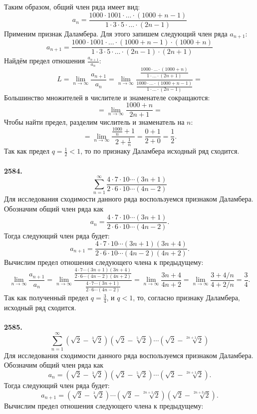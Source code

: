 \documentclass[a4paper, 12pt]{report}
\numberwithin{equation}{section}
\begin{document}
	Таким образом, общий член ряда имеет вид:
	$$ a_n = \frac{1000 \cdot 1001 \cdot \dots \cdot (1000 + n - 1)}{1 \cdot 3 \cdot 5 \cdot \dots \cdot (2n - 1)} $$
	Применим признак Даламбера. Для этого запишем следующий член ряда $a_{n+1}$:
	$$ a_{n+1} = \frac{1000 \cdot 1001 \cdot \dots \cdot (1000 + n - 1) \cdot (1000 + n)}{1 \cdot 3 \cdot 5 \cdot \dots \cdot (2n - 1) \cdot (2n + 1)} $$
	Найдём предел отношения $\frac{a_{n+1}}{a_n}$:
	$$ L = \lim_{n \to \infty} \frac{a_{n+1}}{a_n} = \lim_{n \to \infty} \frac{\frac{1000 \cdot \dots \cdot (1000 + n)}{1 \cdot \dots \cdot (2n + 1)}}{\frac{1000 \cdot \dots \cdot (1000 + n - 1)}{1 \cdot \dots \cdot (2n - 1)}} = $$
	Большинство множителей в числителе и знаменателе сокращаются:
	$$ = \lim_{n \to \infty} \frac{1000+n}{2n+1} = $$
	Чтобы найти предел, разделим числитель и знаменатель на $n$:
	$$ = \lim_{n \to \infty} \frac{\frac{1000}{n} + 1}{2 + \frac{1}{n}} = \frac{0 + 1}{2 + 0} = \frac{1}{2}. $$
	Так как предел $q = \frac{1}{2} < 1$, то по признаку Даламбера исходный ряд сходится.
	\\\\
	\textbf{2584.}
	$$\sum_{n=1}^{\infty} \frac{4 \cdot 7 \cdot 10 \cdots (3n+1)}{2 \cdot 6 \cdot 10 \cdots (4n-2)}$$
	Для исследования сходимости данного ряда воспользуемся признаком Даламбера. Обозначим общий член ряда как
	$$a_n = \frac{4 \cdot 7 \cdot 10 \cdots (3n+1)}{2 \cdot 6 \cdot 10 \cdots (4n-2)}.$$
	Тогда следующий член ряда будет:
	$$a_{n+1} = \frac{4 \cdot 7 \cdot 10 \cdots (3n+1)(3n+4)}{2 \cdot 6 \cdot 10 \cdots (4n-2)(4n+2)}.$$
	Вычислим предел отношения следующего члена к предыдущему:
	$$ \lim_{n \to \infty} \frac{a_{n+1}}{a_n} = \lim_{n \to \infty} \frac{\frac{4 \cdot 7 \cdots (3n+1)(3n+4)}{2 \cdot 6 \cdots (4n-2)(4n+2)}}{\frac{4 \cdot 7 \cdots (3n+1)}{2 \cdot 6 \cdots (4n-2)}} = \lim_{n \to \infty} \frac{3n+4}{4n+2} = \lim_{n \to \infty} \frac{3 + 4/n}{4 + 2/n} = \frac{3}{4}. $$
	Так как полученный предел $q = \frac{3}{4}$, и $q < 1$, то, согласно признаку Даламбера, исходный ряд сходится.
	\\\\
	\textbf{2585.}
	$$\sum_{n=1}^{\infty} (\sqrt{2} - \sqrt[3]{2})(\sqrt{2} - \sqrt[5]{2}) \cdots (\sqrt{2} - \sqrt[2n+1]{2})$$
	Для исследования сходимости данного ряда воспользуемся признаком Даламбера. Обозначим общий член ряда как
	$$a_n = (\sqrt{2} - \sqrt[3]{2})(\sqrt{2} - \sqrt[5]{2}) \cdots (\sqrt{2} - \sqrt[2n+1]{2}).$$
	Тогда следующий член ряда будет:
	$$a_{n+1} = (\sqrt{2} - \sqrt[3]{2}) \cdots (\sqrt{2} - \sqrt[2n+1]{2}) (\sqrt{2} - \sqrt[2n+3]{2}).$$
	Вычислим предел отношения следующего члена к предыдущему:
\end{document}
